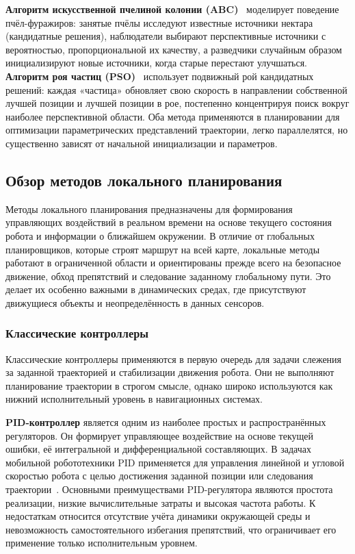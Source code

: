 \documentclass[a4paper,12pt]{extarticle}
\begin{document}
    \textbf{Алгоритм искусственной пчелиной колонии (ABC)}~\cite{abc} моделирует поведение пчёл-фуражиров: занятые пчёлы исследуют известные источники нектара (кандидатные решения), наблюдатели выбирают перспективные источники с вероятностью, пропорциональной их качеству, а разведчики случайным образом инициализируют новые источники, когда старые перестают улучшаться.
    \textbf{Алгоритм роя частиц (PSO)}~\cite{pso} использует подвижный рой кандидатных решений: каждая «частица» обновляет свою скорость в направлении собственной лучшей позиции и лучшей позиции в рое, постепенно концентрируя поиск вокруг наиболее перспективной области.
    Оба метода применяются в планировании для оптимизации параметрических представлений траектории, легко параллелятся, но существенно зависят от начальной инициализации и параметров.

    \subsection{Обзор методов локального планирования}
    Методы локального планирования предназначены для формирования управляющих воздействий в реальном времени на основе
    текущего состояния робота и информации о ближайшем окружении.
    В отличие от глобальных планировщиков, которые строят маршрут на всей карте,
    локальные методы работают в ограниченной области и ориентированы прежде всего на безопасное движение,
    обход препятствий и следование заданному глобальному пути.
    Это делает их особенно важными в динамических средах,
    где присутствуют движущиеся объекты и неопределённость в данных сенсоров.

    \subsubsection{Классические контроллеры}
    Классические контроллеры применяются в первую очередь для задачи слежения за заданной траекторией и
    стабилизации движения робота.
    Они не выполняют планирование траектории в строгом смысле,
    однако широко используются как нижний исполнительный уровень в навигационных системах.

    \textbf{PID-контроллер} является одним из наиболее простых и распространённых регуляторов.
    Он формирует управляющее воздействие на основе текущей ошибки, её интегральной и дифференциальной составляющих.
    В задачах мобильной робототехники PID применяется для управления линейной и угловой скоростью робота
    с целью достижения заданной позиции или следования траектории~\cite{pid}.
    Основными преимуществами PID-регулятора являются простота реализации,
    низкие вычислительные затраты и высокая частота работы.
    К недостаткам относится отсутствие учёта динамики окружающей среды и
    невозможность самостоятельного избегания препятствий,
    что ограничивает его применение только исполнительным уровнем.
\end{document}
